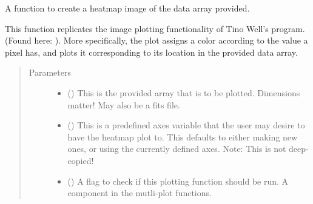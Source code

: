 \documentclass[letterpaper,10pt,english]{sphinxmanual}
\begin{document}
\begin{fulllineitems}
\label{\detokenize{python_docstrings/IfA_Smeargle.oscar.heatmaps:IfA_Smeargle.oscar.heatmaps.plot_array_heatmap_image}}
A function to create a heatmap image of the data array provided.

This function replicates the image plotting functionality of Tino Well’s
program. (Found here: ). More
specifically, the plot assigns a color according to the value a pixel
has, and plots it corresponding to its location in the provided data
array.
\begin{quote}\begin{description}
\item[{Parameters}] \leavevmode\begin{itemize}
\item {} 
 () \textendash{} This is the provided array that is to be plotted. Dimensions matter!
May also be a fits file.

\item {} 
 (\sphinxstyleliteralemphasis{\sphinxupquote{ (}}\sphinxstyleliteralemphasis{\sphinxupquote{)}}) \textendash{} This is a predefined axes variable that the user may desire to have
the heatmap plot to. This defaults to either making new ones, or
using the currently defined axes. Note: This is not deep-copied!

\item {} 
 (\sphinxstyleliteralemphasis{\sphinxupquote{ (}}\sphinxstyleliteralemphasis{\sphinxupquote{)}}) \textendash{} A flag to check if this plotting function should be run. A component
in the mutli-plot functions.


\end{itemize}
\end{description}
\end{quote}
\end{fulllineitems}
\end{document}
